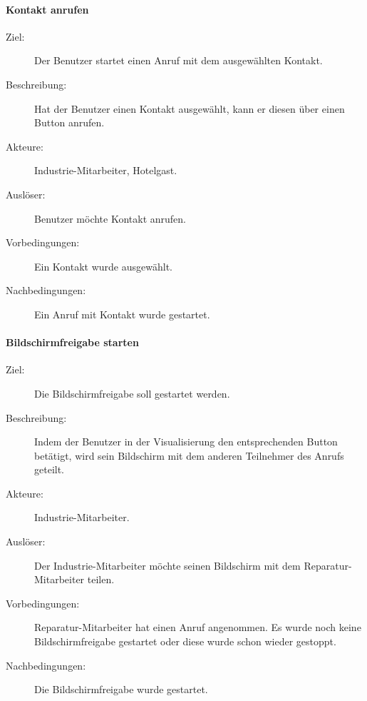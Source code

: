 \paragraph{Kontakt anrufen}
    \begin{description}
        \item[Ziel:] Der Benutzer startet einen Anruf mit dem ausgewählten Kontakt.
        \item[Beschreibung:] Hat der Benutzer einen Kontakt ausgewählt, kann er diesen über einen Button anrufen.
        \item[Akteure:] Industrie-Mitarbeiter, Hotelgast.
        \item[Auslöser:] Benutzer möchte Kontakt anrufen.
        \item[Vorbedingungen:] Ein Kontakt wurde ausgewählt.
        \item[Nachbedingungen:] Ein Anruf mit Kontakt wurde gestartet.
    \end{description}

\paragraph{Bildschirmfreigabe starten}
    \begin{description}
        \item[Ziel:] Die Bildschirmfreigabe soll gestartet werden.
        \item[Beschreibung:] Indem der Benutzer in der Visualisierung den entsprechenden Button betätigt, wird sein Bildschirm mit dem anderen Teilnehmer des Anrufs geteilt.
        \item[Akteure:] Industrie-Mitarbeiter.
        \item[Auslöser:] Der Industrie-Mitarbeiter möchte seinen Bildschirm mit dem Reparatur-Mitarbeiter teilen.
        \item[Vorbedingungen:] Reparatur-Mitarbeiter hat einen Anruf angenommen.
            Es wurde noch keine Bildschirmfreigabe gestartet oder diese wurde schon wieder gestoppt.
        \item[Nachbedingungen:] Die Bildschirmfreigabe wurde gestartet.
    \end{description}

